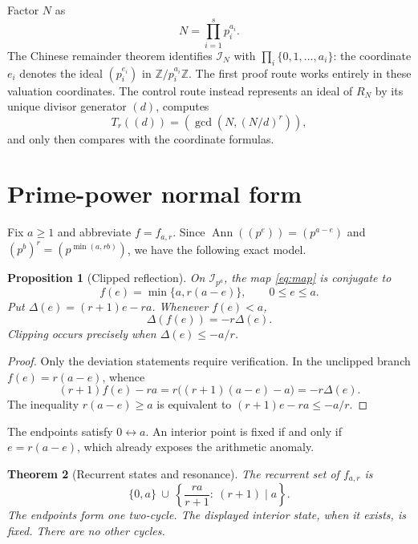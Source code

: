 \documentclass[11pt,a4paper]{amsart}
\newcommand{\Z}{\mathbb Z}
\newcommand{\I}{\mathcal I}
\newcommand{\Ann}{\operatorname{Ann}}
\newtheorem{theorem}{Theorem}[section]
\newtheorem{proposition}[theorem]{Proposition}
\begin{document}
Factor $N$ as
\begin{equation}
 \label{eq:factor}
 N=\prod_{i=1}^{s}p_i^{a_i}.
\end{equation}
The Chinese remainder theorem identifies $\I_N$ with
$\prod_i\{0,1,\ldots,a_i\}$: the coordinate $e_i$ denotes the ideal
$(p_i^{e_i})$ in $\Z/p_i^{a_i}\Z$.  The first proof route works entirely in
these valuation coordinates.  The control route instead represents an ideal
of $R_N$ by its unique divisor generator $(d)$, computes
\begin{equation}
 \label{eq:literal}
 T_r((d))=\left(\gcd\!\left(N,(N/d)^r\right)\right),
\end{equation}
and only then compares with the coordinate formulas.

\section{Prime-power normal form}

Fix $a\geq1$ and abbreviate $f=f_{a,r}$.  Since
$\Ann((p^e))=(p^{a-e})$ and $(p^b)^r=(p^{\min(a,rb)})$, we have the following
exact model.

\begin{proposition}[Clipped reflection]
\label{prop:normal}
On $\I_{p^a}$, the map \eqref{eq:map} is conjugate to
\begin{equation}
 \label{eq:f}
 f(e)=\min\{a,r(a-e)\},\qquad 0\leq e\leq a.
\end{equation}
Put $\Delta(e)=(r+1)e-ra$.  Whenever $f(e)<a$,
\begin{equation}
 \label{eq:deviation}
 \Delta(f(e))=-r\Delta(e).
\end{equation}
Clipping occurs precisely when $\Delta(e)\leq-a/r$.
\end{proposition}

\begin{proof}
Only the deviation statements require verification.  In the unclipped
branch $f(e)=r(a-e)$, whence
\[
 (r+1)f(e)-ra
 =r\bigl((r+1)(a-e)-a\bigr)=-r\Delta(e).
\]
The inequality $r(a-e)\geq a$ is equivalent to
$(r+1)e-ra\leq-a/r$.
\end{proof}

The endpoints satisfy $0\leftrightarrow a$.  An interior point is fixed if
and only if $e=r(a-e)$, which already exposes the arithmetic anomaly.

\begin{theorem}[Recurrent states and resonance]
\label{thm:recurrent-coordinate}
The recurrent set of $f_{a,r}$ is
\begin{equation}
 \label{eq:rec-coordinate}
 \{0,a\}\ \cup\
 \left\{\frac{ra}{r+1}:\ (r+1)\mid a\right\}.
\end{equation}
The endpoints form one two-cycle.  The displayed interior state, when it
exists, is fixed.  There are no other cycles.
\end{theorem}
\end{document}
